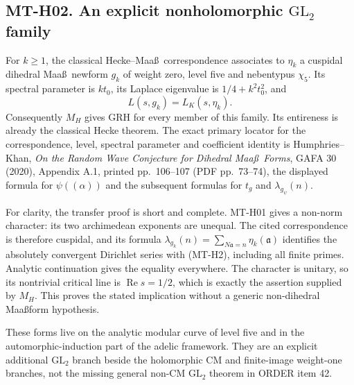 \subsection*{MT-H02. An explicit nonholomorphic \texorpdfstring{$\mathrm{GL}_2$}{GL2} family}
For $k\ge1$, the classical Hecke--Maa\ss\ correspondence associates to
$\eta_k$ a cuspidal dihedral Maa\ss\ newform $g_k$ of weight zero,
level five and nebentypus $\chi_5$. Its spectral parameter is $kt_0$,
its Laplace eigenvalue is $1/4+k^2t_0^2$, and
\[
       L(s,g_k)=L_K(s,\eta_k).
                                                               \tag{MT-H2}
\]
Consequently $M_H$ gives GRH for every member of this family. Its
entireness is already the classical Hecke theorem. The exact primary
locator for the correspondence, level, spectral parameter and coefficient
identity is Humphries--Khan, \emph{On the Random Wave Conjecture for
Dihedral Maa\ss\ Forms}, GAFA 30 (2020), Appendix A.1, printed pp.~106--107 (PDF pp.~73--74), the displayed
formula for $\psi((\alpha))$ and the subsequent formulas for
$t_g$ and $\lambda_{g_\psi}(n)$.

For clarity, the transfer proof is short and complete. MT-H01 gives
a non-norm character: its two archimedean exponents are unequal.
The cited correspondence is therefore cuspidal, and its formula
$\lambda_{g_k}(n)=\sum_{N\mathfrak a=n}\eta_k(\mathfrak a)$ identifies
the absolutely convergent Dirichlet series with (MT-H2), including all
finite primes. Analytic continuation gives the equality everywhere.
The character is unitary, so its nontrivial critical line is
$\operatorname{Re}s=1/2$, which is exactly the assertion supplied by
$M_H$. This proves the stated implication without a generic
non-dihedral Maa\ss\-form hypothesis.

These forms live on the analytic modular curve of level five and in
the automorphic-induction part of the adelic framework. They are an
explicit additional $\mathrm{GL}_2$ branch beside the holomorphic
CM and finite-image weight-one branches, not the missing general
non-CM $\mathrm{GL}_2$ theorem in ORDER item 42.

